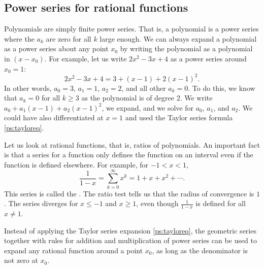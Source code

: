 \subsection{Power series for rational functions}

Polynomials are simply finite power series.  That is, a polynomial
is a power series where
the $a_k$ are zero for all $k$ large enough.  We can always expand
a polynomial as a power series about any point $x_0$ by writing
the polynomial as a polynomial in $(x-x_0)$.  For example,
let us write
$2x^2-3x+4$ as a power series around $x_0 = 1$:
\begin{equation*}
2x^2-3x+4 = 3 + (x-1) + 2{(x-1)}^2 .
\end{equation*}
In other words, $a_0 = 3$, $a_1 = 1$, $a_2 = 2$, and all other
$a_k = 0$.  To do this, we know that $a_k = 0$ for all $k \geq 3$ as the
polynomial is of degree 2.
We write $a_0 + a_1(x-1) + a_2{(x-1)}^2$, we expand, and we solve
for $a_0$, $a_1$, and $a_2$.  We could have also differentiated at $x=1$
and used the Taylor series formula \eqref{ps:tayloreq}.

Let us look at rational functions, that is, ratios of polynomials.
An important fact is 
that a series for a function only defines the function
on an interval even if the function is defined elsewhere.  For example, for
$-1 < x < 1$,
\begin{equation*}
\frac{1}{1-x} =
\sum_{k=0}^\infty x^k =
1 + x + x^2 + \cdots .
\end{equation*}
This series is called the \emph{}.  The ratio
test tells us that the radius of convergence is $1$.  The series
diverges for $x \leq -1$ and $x \geq 1$, even though
$\frac{1}{1-x}$ is defined for all $x \neq 1$.

Instead of applying
the Taylor series expansion \eqref{ps:tayloreq},
the geometric series together with rules for addition and
multiplication of power series can be used to expand any rational function around
a point $x_0$, as long as the denominator is not zero at $x_0$.

